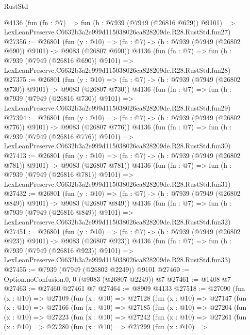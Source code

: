 \begin{lexlean}{RustStd}
\begin{coremodule}
    @4136
    (fun (fn : @7) =>
    fun (h : @7939 (@7949 (@26816 @629)) @9101) =>
    LexLeanPreserve.C6632b3a2e999d115038026ca828209de.R28.RustStd.fun27)
@27356 := @26801
    (fun (y : @10) => (fn : @7) -> (h : @7939 (@7949 (@26802 @690)) @9101) -> @9083 (@26807 @690))
    @4136
    (fun (fn : @7) =>
    fun (h : @7939 (@7949 (@26816 @690)) @9101) =>
    LexLeanPreserve.C6632b3a2e999d115038026ca828209de.R28.RustStd.fun28)
@27375 := @26801
    (fun (y : @10) => (fn : @7) -> (h : @7939 (@7949 (@26802 @730)) @9101) -> @9083 (@26807 @730))
    @4136
    (fun (fn : @7) =>
    fun (h : @7939 (@7949 (@26816 @730)) @9101) =>
    LexLeanPreserve.C6632b3a2e999d115038026ca828209de.R28.RustStd.fun29)
@27394 := @26801
    (fun (y : @10) => (fn : @7) -> (h : @7939 (@7949 (@26802 @776)) @9101) -> @9083 (@26807 @776))
    @4136
    (fun (fn : @7) =>
    fun (h : @7939 (@7949 (@26816 @776)) @9101) =>
    LexLeanPreserve.C6632b3a2e999d115038026ca828209de.R28.RustStd.fun30)
@27413 := @26801
    (fun (y : @10) => (fn : @7) -> (h : @7939 (@7949 (@26802 @781)) @9101) -> @9083 (@26807 @781))
    @4136
    (fun (fn : @7) =>
    fun (h : @7939 (@7949 (@26816 @781)) @9101) =>
    LexLeanPreserve.C6632b3a2e999d115038026ca828209de.R28.RustStd.fun31)
@27432 := @26801
    (fun (y : @10) => (fn : @7) -> (h : @7939 (@7949 (@26802 @849)) @9101) -> @9083 (@26807 @849))
    @4136
    (fun (fn : @7) =>
    fun (h : @7939 (@7949 (@26816 @849)) @9101) =>
    LexLeanPreserve.C6632b3a2e999d115038026ca828209de.R28.RustStd.fun32)
@27451 := @26801
    (fun (y : @10) => (fn : @7) -> (h : @7939 (@7949 (@26802 @923)) @9101) -> @9083 (@26807 @923))
    @4136
    (fun (fn : @7) =>
    fun (h : @7939 (@7949 (@26816 @923)) @9101) =>
    LexLeanPreserve.C6632b3a2e999d115038026ca828209de.R28.RustStd.fun33)
@27455 := @7939 (@7949 (@26802 @2249)) @9101
@27460 := Option.noConfusion.{0, 0} (@9083 (@26807 @2249)) @7
@27461 := @1408 @7
@27463 := @27460 @27461 @7
@27464 := @8909 @4133
@27518 := @27090
    (fun (x : @10) =>
    @27109
      (fun (x : @10) =>
      @27128
        (fun (x : @10) =>
        @27147
          (fun (x : @10) =>
          @27166
            (fun (x : @10) =>
            @27185
              (fun (x : @10) =>
              @27204
                (fun (x : @10) =>
                @27223
                  (fun (x : @10) =>
                  @27242
                    (fun (x : @10) =>
                    @27261
                      (fun (x : @10) =>
                      @27280
                        (fun (x : @10) =>
                        @27299
                          (fun (x : @10) =>

\end{coremodule}
\end{lexlean}
